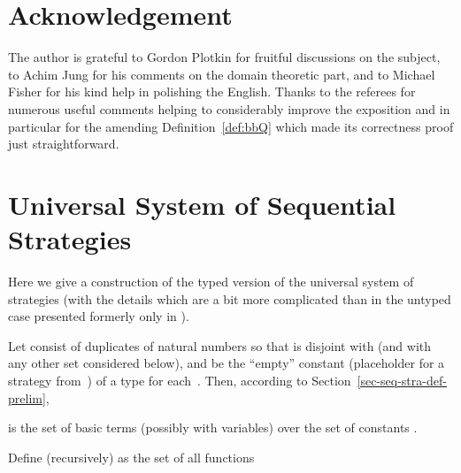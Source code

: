 \documentclass[fleqn]{LMCS}
\theoremstyle{plain}\newtheorem{satz}[thm]{Satz}
\theoremstyle{plain}\newtheorem{hyp}[thm]{Hypothesis}
\theoremstyle{plain}\newtheorem{hyps}[thm]{Hypotheses}
\theoremstyle{definition}\newtheorem{note}[thm]{Note}
\newcommand{\?}{\mbox{?}}
\begin{document}
\section*{Acknowledgement} 

\noindent
The author is grateful to Gordon Plotkin 
for fruitful discussions on the subject, to Achim Jung for his comments on 
the domain theoretic part,  
and to Michael Fisher for his kind help in polishing the English. 
Thanks to the referees for numerous useful comments helping to considerably improve 
the exposition and in particular for the amending Definition~\ref{def:bbQ} 
which made its correctness proof just straightforward. 


















\appendix 
\section{Universal System of Sequential Strategies 
\texorpdfstring{}{}}
\label{appendix:univ-sys-strategies}

\newcommand{\BT}{\mbox{BT}_\Box}
\newcommand{\qq}{q}
\newcommand{\pp}{p}
\newcommand{\type}{\textrm{\bf type}}
\newcommand{\Types}{\textrm{Types}}
\newcommand{\Erase}{\Box}

\noindent
Here we give a construction of the typed version of the universal system of strategies 
 \cite{Saz76SMZH} 
(with the details which are a bit more complicated than in the untyped case 
presented formerly only in \cite{Saz76t}). 

Let  consist of duplicates of natural numbers  
so that  is disjoint with  (and with any other set considered below), 
and  be the ``empty'' constant (placeholder for a strategy 
from~) of a type  for each~. 
Then, according to Section~\ref{sec-seq-stra-def-prelim}, 
 
is the set of basic terms (possibly with variables) over 
the set of constants . 

Define  (recursively) as the set of all functions 
\end{document}
